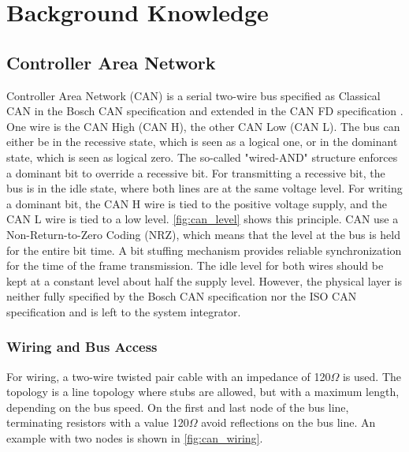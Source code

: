 
\chapter{Background Knowledge}
\label{cha:background}

\section{Controller Area Network}
\label{sec:can}
Controller Area Network (CAN) is a serial two-wire bus specified as Classical CAN in the Bosch CAN specification \cite{BoschCAN}
and extended in the CAN FD specification \cite{BoschCANFD}.
One wire is the CAN High (CAN H), the other CAN Low (CAN L).
The bus can either be in the recessive state, which is seen as a logical one, or in the dominant state, which is seen as logical zero.
The so-called "wired-AND" structure enforces a dominant bit to override a recessive bit.
For transmitting a recessive bit, the bus is in the idle state, where both lines are at the same voltage level.
For writing a dominant bit, the CAN H wire is tied to the positive voltage supply, and the CAN L wire is tied to a low level.
\autoref{fig:can_level} shows this principle.
CAN use a Non-Return-to-Zero Coding (NRZ), which means that the level at the bus is held for the entire bit time.
A bit stuffing mechanism provides reliable synchronization for the time of the frame transmission.
The idle level for both wires should be kept at a constant level about half the supply level.
However, the physical layer is neither fully specified by the Bosch CAN specification \cite{BoschCAN} \cite{BoschCANFD}
nor the ISO CAN specification \cite{ISO11898} and is left to the system integrator.



\subsection{Wiring and Bus Access}
\label{sec:wiring_access}

For wiring, a two-wire twisted pair cable with an impedance of 120$\Omega$ is used.
The topology is a line topology where stubs are allowed, but with a maximum length, depending on the bus speed.
On the first and last node of the bus line, terminating resistors with a value 120$\Omega$ avoid reflections on the bus line.
An example with two nodes is shown in \autoref{fig:can_wiring}.



